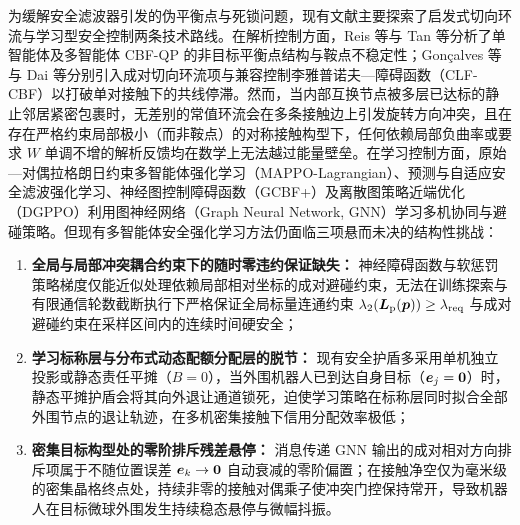 为缓解安全滤波器引发的伪平衡点与死锁问题，现有文献主要探索了启发式切向环流与学习型安全控制两条技术路线。在解析控制方面，Reis 等\cite{reis2021}与 Tan 等\cite{tan2024equilibria}分析了单智能体及多智能体 CBF-QP 的非目标平衡点结构与鞍点不稳定性；Gon\c{c}alves 等\cite{goncalves2023circulation}与 Dai 等\cite{dai2024compatible}分别引入成对切向环流项与兼容控制李雅普诺夫—障碍函数（CLF-CBF）以打破单对接触下的共线停滞。然而，当内部互换节点被多层已达标的静止邻居紧密包裹时，无差别的常值环流会在多条接触边上引发旋转方向冲突，且在存在严格约束局部极小（而非鞍点）的对称接触构型下，任何依赖局部负曲率或要求 $W$ 单调不增的解析反馈均在数学上无法越过能量壁垒。在学习控制方面，原始—对偶拉格朗日约束多智能体强化学习（MAPPO-Lagrangian）\cite{gu2023safe}、预测与自适应安全滤波强化学习\cite{wabersich2021,liu2026saferl}、神经图控制障碍函数（GCBF+）\cite{zhang2025gcbf}及离散图策略近端优化（DGPPO）\cite{zhang2025dgppo}利用图神经网络（Graph Neural Network, GNN）学习多机协同与避碰策略。但现有多智能体安全强化学习方法仍面临三项悬而未决的结构性挑战：
\begin{enumerate}
 \item \textbf{全局与局部冲突耦合约束下的随时零违约保证缺失：} 神经障碍函数与软惩罚策略梯度仅能近似处理依赖局部相对坐标的成对避碰约束，无法在训练探索与有限通信轮数截断执行下严格保证全局标量连通约束 $\lambda_2(\boldsymbol{L}_{\mathrm{p}}(\boldsymbol{p}))\ge\lambda_{\mathrm{req}}$ 与成对避碰约束在采样区间内的连续时间硬安全；
 \item \textbf{学习标称层与分布式动态配额分配层的脱节：} 现有安全护盾多采用单机独立投影或静态责任平摊（$B=0$），当外围机器人已到达自身目标（$\boldsymbol{e}_j=\boldsymbol 0$）时，静态平摊护盾会将其向外退让通道锁死，迫使学习策略在标称层同时拟合全部外围节点的退让轨迹，在多机密集接触下信用分配效率极低；
 \item \textbf{密集目标构型处的零阶排斥残差悬停：} 消息传递 GNN 输出的成对相对方向排斥项属于不随位置误差 $\boldsymbol{e}_k\to\boldsymbol 0$ 自动衰减的零阶偏置；在接触净空仅为毫米级的密集晶格终点处，持续非零的接触对偶乘子使冲突门控保持常开，导致机器人在目标微球外围发生持续稳态悬停与微幅抖振。
\end{enumerate}

